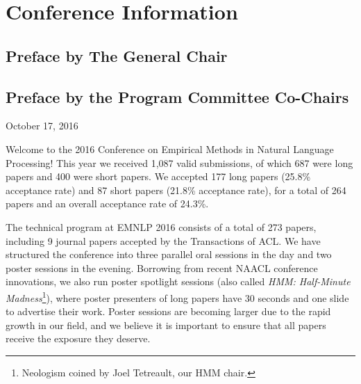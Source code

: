 
\chapter{Conference Information}

\section{Preface by The General Chair}


\newpage{}


\section{Preface by the Program Committee Co-Chairs}


\vskip 1cm
\hfill October 17, 2016
\vskip 1cm

Welcome to the 2016 Conference on Empirical Methods in Natural Language Processing!
This year we received 1,087 valid submissions, of which 687 were long
papers and 400 were short papers.
We accepted 177 long papers (25.8\% acceptance rate) and 
87 short papers (21.8\% acceptance rate), for a total of 
264 papers and an overall acceptance rate of 24.3\%.

The technical program at EMNLP 2016 consists of a total of 273 papers, including 9 journal papers accepted by the Transactions of ACL. 
We have structured the conference into three parallel oral sessions in the day and two poster sessions in the evening. 
%
Borrowing from
recent NAACL conference innovations, we also run poster spotlight sessions (also called \emph{HMM: Half-Minute Madness}\footnote{Neologism coined by Joel Tetreault, our HMM chair.}), where poster presenters of long papers have 30 seconds and one slide to advertise their work. Poster sessions are becoming larger due to the rapid growth in our field, and we believe it 
is important to ensure that all papers receive the exposure they deserve. 


